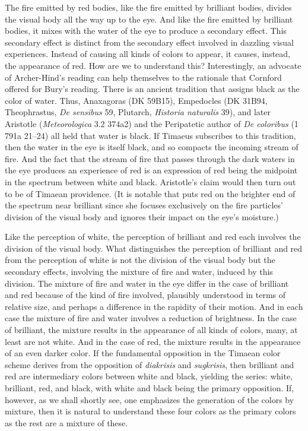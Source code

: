 The fire emitted by red bodies, like the fire emitted by brilliant bodies, divides the visual body all the way up to the eye. And like the fire emitted by brilliant bodies, it mixes with the water of the eye to produce a secondary effect. This secondary effect is distinct from the secondary effect involved in dazzling visual experiences. Instead of causing all kinds of colors to appear, it causes, instead, the appearance of red. How are we to understand this? Interestingly, an advocate of Archer-Hind's reading can help themselves to the rationale that Cornford offered for Bury's reading. There is an ancient tradition that assigns black as the color of water. Thus, Anaxagoras (DK 59B15), Empedocles (DK 31B94, Theophrastus, \emph{De sensibus} 59, Plutarch, \emph{Historia naturalis} 39), and later Aristotle (\emph{Meteorologica} 3.2 374a2) and the Peripatetic author of \emph{De coloribus} (1 791a 21--24) all held that water is black. If Timaeus subscribes to this tradition, then the water in the eye is itself black, and so compacts the incoming stream of fire. And the fact that the stream of fire that passes through the dark waters in the eye produces an experience of red is an expression of red being the midpoint in the spectrum between white and black. Aristotle's claim would then turn out to be of Timaean providence. (It is notable that \citealt[57]{James:1996pb} puts red on the brighter end of the spectrum near brilliant since she focuses exclusively on the fire particles' division of the visual body and ignores their impact on the eye's moisture.)

Like the perception of white, the perception of brilliant and red each involves the division of the visual body. What distinguishes the perception of brilliant and red from the perception of white is not the division of the visual body but the secondary effects, involving the mixture of fire and water, induced by this division. The mixture of fire and water in the eye differ in the case of brilliant and red because of the kind of fire involved, plausibly understood in terms of relative size, and perhaps a difference in the rapidity of their motion. And in each case the mixture of fire and water involves a reduction of brightness. In the case of brilliant, the mixture results in the appearance of all kinds of colors, many, at least are not white. And in the case of red, the mixture results in the appearance of an even darker color. If the fundamental opposition in the Timaean color scheme derives from the opposition of \emph{diakrisis} and \emph{sugkrisis}, then brilliant and red are intermediary colors between white and black, yielding the series: white, brilliant, red, and black, with white and black being the primary opposition. If, however, as we shall shortly see, one emphasizes the generation of the colors by mixture, then it is natural to understand these four colors as the primary colors as the rest are a mixture of these.

